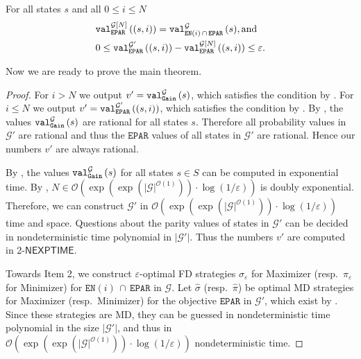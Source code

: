 \documentclass[a4paper,UKenglish,cleveref,autoref,thm-restate]{lipics-v2021}
\DeclareMathOperator{\Gain}{\mathtt{Gain}}
\newcommand{\Eparity}{\mathtt{EPAR}}
\newcommand{\en}{\mathtt{EN}}
\newcommand{\+}[1]{\mathbb{#1}}
\newcommand{\?}[1]{\mathcal{#1}}
\newcommand{\Ocompl}{\?{O}}
\newcommand{\abs}[1]{\lvert#1\rvert}
\newcommand{\size}[1]{\abs{#1}}
\newcommand{\eps}{\varepsilon}
\newcommand{\NEXPTIME}{\ensuremath{\mathsf{NEXPTIME}}}
\newcommand{\lrb}[1]{\left[#1\right]}
\newcommand{\lrc}[1]{\left(#1\right)}
\newcommand{\game}{{\mathcal G}}
\newcommand{\states}{S}
\newcommand{\s}{s}
\newcommand{\zstrat}{\sigma}
\newcommand{\ostrat}{\pi}
\begin{document}
\begin{lemma}\label{lem:approxenparvalueslessthanN}
For all states $\s$ and all $0 \leq i \leq N$
\begin{align*}
        &\valueof[\game\lrb{N}][\Eparity]{\lrc{\s,i}} =
          \valueof[\game][\en(i)\, \cap \, \Eparity]{\s}, \mbox{and}\\
        & 0 \le \valueof[\game^\prime][\Eparity]{\lrc{\s,i}} - \valueof[\game\lrb{N}][\Eparity]{\lrc{\s,i}} \leq \eps.
    \end{align*}
\end{lemma}

Now we are ready to prove the main theorem.

\thmapproxenpar*
\begin{proof}
For $i > N$ we output $v' = \valueof[\game][\Gain]{\s}$, which satisfies the
condition by .
For $i \le N$ we output $v' = \valueof[\game'][\Eparity]{\lrc{\s,i}}$, which
satisfies the condition by .
By , the values $\valueof[\game][\Gain]{\s}$ are
rational for all states $\s$. Therefore all probability values in $\game'$ are
rational and thus the $\Eparity$ values of all states in $\game'$ are rational. 
Hence our numbers $v'$ are always rational.

By , the values $\valueof[\game][\Gain]{\s}$ for
all states $\s \in \states$ can be computed in exponential time.
By , $N \in
{\Ocompl}\left(\exp(\exp(\size{\game}^{\Ocompl(1)}))\cdot \log\lrc{1/\eps}\right)$
is doubly exponential.
Therefore, we can construct $\game'$ in 
${\Ocompl}\left(\exp(\exp(\size{\game}^{\Ocompl(1)}))\cdot
  \log\lrc{1/\eps}\right)$ time and space.
Questions about the parity values of states in $\game'$ can be decided in
nondeterministic time polynomial in $|\game'|$. Thus the numbers $v'$ are computed in 2-\NEXPTIME.

Towards Item 2, we construct $\eps$-optimal FD strategies $\zstrat_\eps$
for Maximizer (resp.\ $\ostrat_\eps$ for Minimizer) for
$\en(i)\,\cap\,\Eparity$ in $\game$.
Let $\hat{\zstrat}$
(resp.\ $\hat{\ostrat}$)
be optimal MD strategies
for Maximizer (resp.\ Minimizer) for the objective $\Eparity$ in $\game'$,
which exist by .
Since these strategies are MD, they can be guessed in nondeterministic time
polynomial in the size $|\game'|$, and thus 
in ${\Ocompl}\left(\exp(\exp(\size{\game}^{\Ocompl(1)}))\cdot
  \log\lrc{1/\eps}\right)$ nondeterministic time.


\end{proof}
\end{document}
